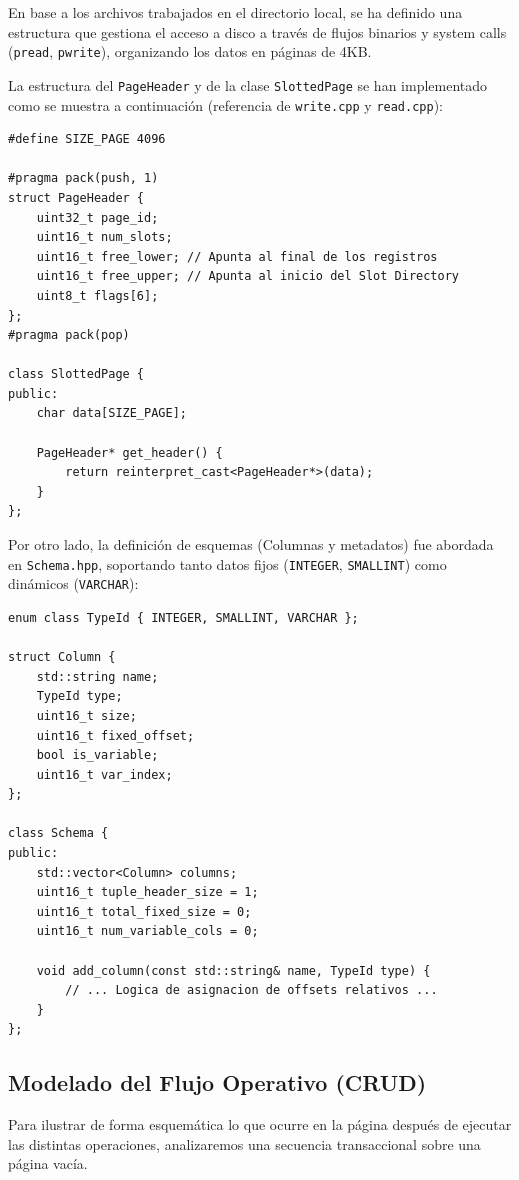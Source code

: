 \documentclass[12pt,a4paper]{article}
\begin{document}
En base a los archivos trabajados en el directorio local, se ha definido una estructura que gestiona el acceso a disco a través de flujos binarios y system calls (\texttt{pread}, \texttt{pwrite}), organizando los datos en páginas de 4KB.

La estructura del \texttt{PageHeader} y de la clase \texttt{SlottedPage} se han implementado como se muestra a continuación (referencia de \texttt{write.cpp} y \texttt{read.cpp}):

\begin{lstlisting}[caption={Definición de Cabecera y Página Slotted}]
#define SIZE_PAGE 4096

#pragma pack(push, 1)
struct PageHeader {
    uint32_t page_id;
    uint16_t num_slots;
    uint16_t free_lower; // Apunta al final de los registros
    uint16_t free_upper; // Apunta al inicio del Slot Directory
    uint8_t flags[6];
};
#pragma pack(pop)

class SlottedPage {
public: 
    char data[SIZE_PAGE];
    
    PageHeader* get_header() {
        return reinterpret_cast<PageHeader*>(data);
    }
};
\end{lstlisting}

Por otro lado, la definición de esquemas (Columnas y metadatos) fue abordada en \texttt{Schema.hpp}, soportando tanto datos fijos (\texttt{INTEGER}, \texttt{SMALLINT}) como dinámicos (\texttt{VARCHAR}):

\begin{lstlisting}[caption={Definición de Esquema}]
enum class TypeId { INTEGER, SMALLINT, VARCHAR };

struct Column {
    std::string name;
    TypeId type;
    uint16_t size;
    uint16_t fixed_offset;
    bool is_variable;
    uint16_t var_index;
};

class Schema {
public:
    std::vector<Column> columns;
    uint16_t tuple_header_size = 1; 
    uint16_t total_fixed_size = 0;  
    uint16_t num_variable_cols = 0; 

    void add_column(const std::string& name, TypeId type) {
        // ... Logica de asignacion de offsets relativos ...
    }
};
\end{lstlisting}

\subsection{Modelado del Flujo Operativo (CRUD)}

Para ilustrar de forma esquemática lo que ocurre en la página después de ejecutar las distintas operaciones, analizaremos una secuencia transaccional sobre una página vacía.
\end{document}

